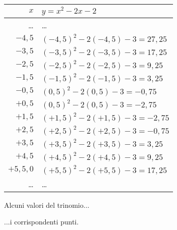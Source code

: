 \begin{figure}[h]
 \begin{minipage}[]{.48\textwidth}
  \begin{center}
   \begin{tabular}{r|l}
    $x$   & $y=x^2-2x-2$ \\
    \hline
    \dots & \dots \\
    $-4,5$ & $(-4,5)^2 -2(-4,5) -3 = 27,25$ \\
    $-3,5$ & $(-3,5)^2 -2(-3,5) -3 = 17,25$ \\
    $-2,5$ & $(-2,5)^2 -2(-2,5) -3 = 9,25$ \\
    $-1,5$ & $(-1,5)^2 -2(-1,5) -3 = 3,25$ \\
    $-0,5$ & $(0,5)^2 -2(0,5) -3 = -0,75$ \\
    $+0,5$ & $(0,5)^2 -2(0,5) -3 = -2,75$ \\
    $+1,5$ & $(+1,5)^2 -2(+1,5) -3 = -2,75$ \\
    $+2,5$ & $(+2,5)^2 -2(+2,5) -3 = -0,75$ \\
    $+3,5$ & $(+3,5)^2 -2(+3,5) -3 = 3,25$ \\
    $+4,5$ & $(+4,5)^2 -2(+4,5) -3 = 9,25$ \\
    $+5,5,0$ & $(+5,5)^2 -2(+5,5) -3 = 17,25$ \\
    \dots & \dots \\
   \end{tabular}
  \caption{Alcuni valori del trinomio...} \label{tab:tabella1}
  \end{center}
\end{minipage}
\begin{minipage}[]{.48\textwidth}
\begin{center}
\begin{inaccessibleblock}
 
 \caption{...i corrispondenti punti.}\label{fig:trinomio1}
\end{inaccessibleblock}
\end{center}
\end{minipage}
\end{figure}


